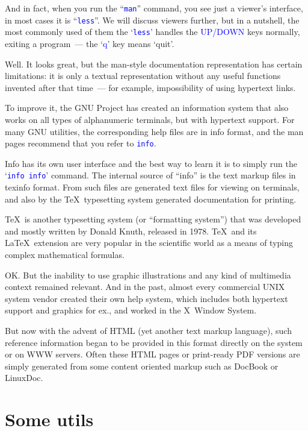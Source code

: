 \documentclass[12pt]{report}
\newcommand{\struct}[1]{\textcolor{blue}{#1}}
\newcommand{\cmd}[1]{\textcolor{blue}{\tt #1}}
\begin{document}
And in fact, when you run the ``\cmd{man}'' command, you see just a viewer's
interface, in most cases it is ``\cmd{less}''. We will discuss viewers further,
but in a nutshell, the most commonly used of them the `\cmd{less}' handles
the \struct{UP/DOWN} keys normally, exiting a program~--- the `\struct{q}' key
means `quit'.

Well. It looks great, but the man-style documentation representation has
certain limitations: it is only a textual representation without any
useful functions invented after that time~--- for example, impossibility of
using hypertext links.

To improve it, the GNU Project has created an information system that
also works on all types of alphanumeric terminals, but with hypertext support.
For many GNU utilities, the corresponding help files are in info format,
and the man pages recommend that you refer to \cmd{info}.

Info has its own user interface and the best way to learn it is to simply
run the `\cmd{info info}' command. The internal source of ``info'' is the text
markup files in texinfo format. From such files are generated text files
for viewing on terminals, and also by the \TeX\ typesetting system
generated documentation for printing.

\TeX\ is another typesetting system (or ``formatting system'') that was
developed and mostly written by Donald Knuth, released in 1978. \TeX\ and
its \LaTeX\ extension are very popular in the scientific world as a means
of typing complex mathematical formulas.

OK. But the inability to use graphic illustrations and any kind of multimedia
context remained relevant. And in the past, almost every commercial UNIX system
vendor created their own help system, which includes both hypertext support
and graphics for ex., and worked in the X~Window System.

But now with the advent of HTML (yet another text markup language), such
reference information began to be provided in this format directly on
the system or on WWW servers. Often these HTML pages or print-ready PDF versions
are simply generated from some content oriented markup such as DocBook or
LinuxDoc.

\section*{Some utils}
\end{document}
